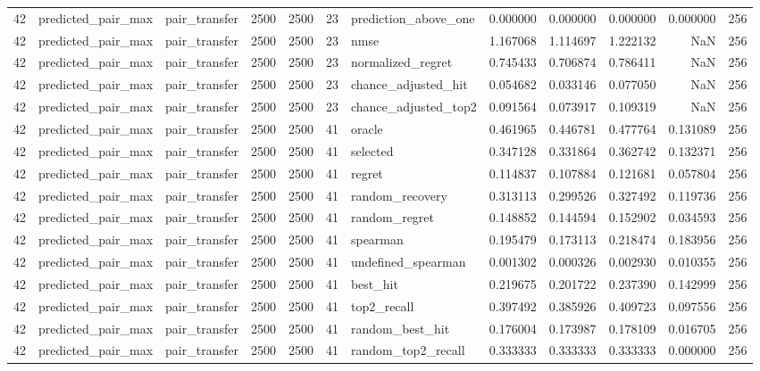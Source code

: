 \begin{tabular}{rllrrrlrrrrr}
42 & predicted_pair_max & pair_transfer & 2500 & 2500 & 23 & prediction_above_one & 0.000000 & 0.000000 & 0.000000 & 0.000000 & 256 \\
42 & predicted_pair_max & pair_transfer & 2500 & 2500 & 23 & nmse & 1.167068 & 1.114697 & 1.222132 & NaN & 256 \\
42 & predicted_pair_max & pair_transfer & 2500 & 2500 & 23 & normalized_regret & 0.745433 & 0.706874 & 0.786411 & NaN & 256 \\
42 & predicted_pair_max & pair_transfer & 2500 & 2500 & 23 & chance_adjusted_hit & 0.054682 & 0.033146 & 0.077050 & NaN & 256 \\
42 & predicted_pair_max & pair_transfer & 2500 & 2500 & 23 & chance_adjusted_top2 & 0.091564 & 0.073917 & 0.109319 & NaN & 256 \\
42 & predicted_pair_max & pair_transfer & 2500 & 2500 & 41 & oracle & 0.461965 & 0.446781 & 0.477764 & 0.131089 & 256 \\
42 & predicted_pair_max & pair_transfer & 2500 & 2500 & 41 & selected & 0.347128 & 0.331864 & 0.362742 & 0.132371 & 256 \\
42 & predicted_pair_max & pair_transfer & 2500 & 2500 & 41 & regret & 0.114837 & 0.107884 & 0.121681 & 0.057804 & 256 \\
42 & predicted_pair_max & pair_transfer & 2500 & 2500 & 41 & random_recovery & 0.313113 & 0.299526 & 0.327492 & 0.119736 & 256 \\
42 & predicted_pair_max & pair_transfer & 2500 & 2500 & 41 & random_regret & 0.148852 & 0.144594 & 0.152902 & 0.034593 & 256 \\
42 & predicted_pair_max & pair_transfer & 2500 & 2500 & 41 & spearman & 0.195479 & 0.173113 & 0.218474 & 0.183956 & 256 \\
42 & predicted_pair_max & pair_transfer & 2500 & 2500 & 41 & undefined_spearman & 0.001302 & 0.000326 & 0.002930 & 0.010355 & 256 \\
42 & predicted_pair_max & pair_transfer & 2500 & 2500 & 41 & best_hit & 0.219675 & 0.201722 & 0.237390 & 0.142999 & 256 \\
42 & predicted_pair_max & pair_transfer & 2500 & 2500 & 41 & top2_recall & 0.397492 & 0.385926 & 0.409723 & 0.097556 & 256 \\
42 & predicted_pair_max & pair_transfer & 2500 & 2500 & 41 & random_best_hit & 0.176004 & 0.173987 & 0.178109 & 0.016705 & 256 \\
42 & predicted_pair_max & pair_transfer & 2500 & 2500 & 41 & random_top2_recall & 0.333333 & 0.333333 & 0.333333 & 0.000000 & 256 \\

\end{tabular}
